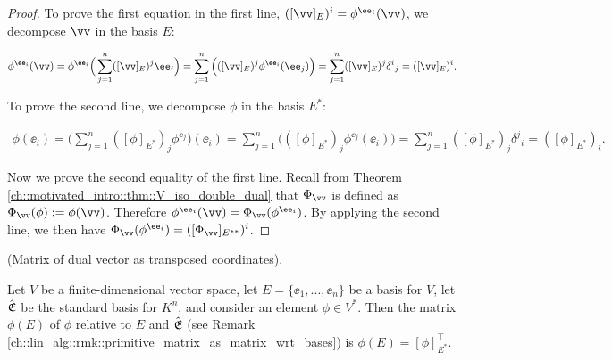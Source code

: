 \begin{proof}
    To prove the first equation in the first line, $([\vv]_E)^i = \phi^{\ee_i}(\vv)$, we decompose $\vv$ in the basis $E$:
    
    \begin{align*}
        \phi^{\ee_i}(\vv) = \phi^{\ee_i}\Big( \sum_{j = 1}^n ([\vv]_E)^j \ee_i \Big) = \sum_{j = 1}^n \Big( ([\vv]_E)^j \phi^{\ee_i}(\ee_j) \Big) = \sum_{j = 1}^n ([\vv]_E)^j \delta^i{}_j = ([\vv]_E)^i.
    \end{align*}
    
    To prove the second line, we decompose $\phi$ in the basis $E^*$:
    
    \begin{align*}
        \phi(\ee_i) = \Big( \sum_{j = 1}^n ([\phi]_{E^*})_j \phi^{\ee_j} \Big)(\ee_i) = \sum_{j = 1}^n \Big( ([\phi]_{E^*})_j \phi^{\ee_j}(\ee_i)\Big) = \sum_{j = 1}^n ([\phi]_{E^*})_j \delta^j{}_i = ([\phi]_{E^*})_i.
    \end{align*}
    
    Now we prove the second equality of the first line. Recall from Theorem \ref{ch::motivated_intro::thm::V_iso_double_dual} that $\Phi_\vv$ is defined as $\Phi_\vv(\phi) := \phi(\vv)$. Therefore $\phi^{\ee_i}(\vv) = \Phi_\vv(\phi^{\ee_i})$. By applying the second line, we then have $\Phi_\vv(\phi^{\ee_i}) = ([\Phi_\vv]_{E^{**}})^i$.
\end{proof}

\begin{theorem}
    \label{ch::bilinear_forms_metric_tensors::thm::matrix_of_dual_vector_as_trtransposed_coords}
    
    (Matrix of dual vector as transposed coordinates).
    
    Let $V$ be a finite-dimensional vector space, let $E = \{\ee_1, ..., \ee_n\}$ be a basis for $V$, let ${\hat{\mathfrak{E}}}$ be the standard basis for $K^n$, and consider an element $\phi \in V^*$. Then the matrix $\phi(E)$ of $\phi$ relative to $E$ and ${\hat{\mathfrak{E}}}$ (see Remark \ref{ch::lin_alg::rmk::primitive_matrix_as_matrix_wrt_bases}) is $\phi(E) = [\phi]_{E^*}^\top$.
\end{theorem}


